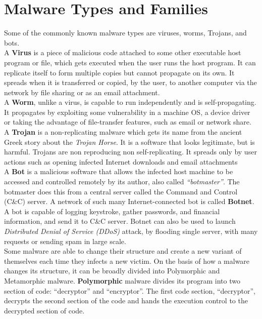 \section{Malware Types and Families}
\label{sec:Malware Types and Families}
Some of the commonly known malware types are viruses, worms, Trojans, and bots.\\
A \textbf{Virus} is a piece of malicious code attached to some other executable host program or file, which gets executed when the user runs the host program.
It can replicate itself to form multiple copies but cannot propagate on its own.
It spreads when it is transferred or copied, by the user, to another computer via the network by file sharing or as an email attachment.\\
A \textbf{Worm}, unlike a virus, is capable to run independently and is self-propagating.
It propagates by exploiting some vulnerability in a machine OS, a device driver or taking the advantage of file-transfer features, such as email or network share.\\
A \textbf{Trojan} is a non-replicating malware which gets its name from the ancient Greek story about the \textit{Trojan Horse}.
It is a software that looks legitimate, but is harmful.
Trojans are non reproducing non self-replicating.
It spreads only by user actions such as opening infected Internet downloads and email attachments~\cite[]{ciscodif} \\
A \textbf{Bot} is a malicious software that allows the infected host machine to be accessed and controlled remotely by its author, also called \emph{``botmaster''}.
The botmaster does this from a central server called the Command and Control (C\&C) server.
A network of such many Internet-connected bot is called \textbf{Botnet}.
A bot is capable of logging keystroke, gather passwords, and financial information, and send it to C\&C server.
Botnet can also be used to launch \emph{Distributed Denial of Service (DDoS)} attack, by flooding single server, with many requests or sending spam in large scale.\\
Some malware are able to change their structure and create a new variant of themselves each time they infects a new victim.
On the basis of how a malware changes its structure, it can be broadly divided into Polymorphic and Metamorphic malware.
\textbf{Polymorphic} malware divides its program into two section of code: ``decryptor'' and ``encryptor''.
The first code section, ``decryptor'', decrypts the second section of the code and hands the execution control to the decrypted section of code.
